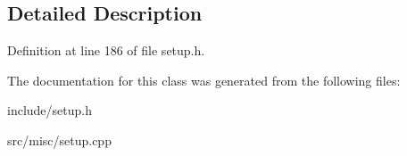 \subsection{Detailed Description}


Definition at line 186 of file setup.\-h.



The documentation for this class was generated from the following files\-:\begin{DoxyCompactItemize}
\item 
include/setup.\-h\item 
src/misc/setup.\-cpp\end{DoxyCompactItemize}
